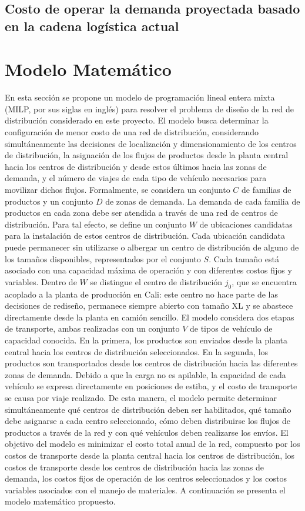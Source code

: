 \documentclass[fleqn, 11pt,letterpaper]{article}
\begin{document}
\subsection{Costo de operar la demanda proyectada basado en la cadena logística actual}

\section{Modelo Matemático}
En esta sección se propone un modelo de programación lineal entera mixta (MILP, por sus siglas en inglés) para resolver el problema de diseño de la red de distribución considerado en este proyecto. El modelo busca determinar la configuración de menor costo de una red de distribución, considerando simultáneamente las decisiones de localización y dimensionamiento de los centros de distribución, la asignación de los flujos de productos desde la planta central hacia los centros de distribución y desde estos últimos hacia las zonas de demanda, y el número de viajes de cada tipo de vehículo necesarios para movilizar dichos flujos. Formalmente, se considera un conjunto $C$ de familias de productos y un conjunto $D$ de zonas de demanda. La demanda de cada familia de productos en cada zona debe ser atendida a través de una red de centros de distribución. Para tal efecto, se define un conjunto $W$ de ubicaciones candidatas para la instalación de estos centros de distribución. Cada ubicación candidata puede permanecer sin utilizarse o albergar un centro de distribución de alguno de los tamaños disponibles, representados por el conjunto $S$. Cada tamaño está asociado con una capacidad máxima de operación y con diferentes costos fijos y variables. Dentro de $W$ se distingue el centro de distribución $j_0$, que se encuentra acoplado a la planta de producción en Cali: este centro no hace parte de las decisiones de rediseño, permanece siempre abierto con tamaño XL y se abastece directamente desde la planta en camión sencillo. El modelo considera dos etapas de transporte, ambas realizadas con un conjunto $V$ de tipos de vehículo de capacidad conocida. En la primera, los productos son enviados desde la planta central hacia los centros de distribución seleccionados. En la segunda, los productos son transportados desde los centros de distribución hacia las diferentes zonas de demanda. Debido a que la carga no es apilable, la capacidad de cada vehículo se expresa directamente en posiciones de estiba, y el costo de transporte se causa por viaje realizado. De esta manera, el modelo permite determinar simultáneamente qué centros de distribución deben ser habilitados, qué tamaño debe asignarse a cada centro seleccionado, cómo deben distribuirse los flujos de productos a través de la red y con qué vehículos deben realizarse los envíos. El objetivo del modelo es minimizar el costo total anual de la red, compuesto por los costos de transporte desde la planta central hacia los centros de distribución, los costos de transporte desde los centros de distribución hacia las zonas de demanda, los costos fijos de operación de los centros seleccionados y los costos variables asociados con el manejo de materiales. A continuación se presenta el modelo matemático propuesto.
\end{document}
